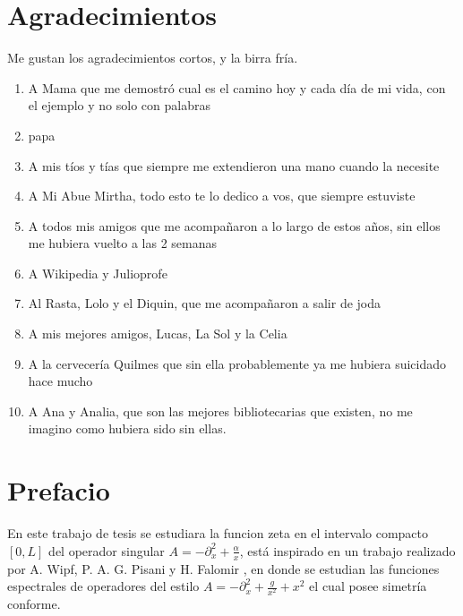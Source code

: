 \documentclass[11pt]{book}
\begin{document}
\chapter*{Agradecimientos}

Me gustan los agradecimientos cortos, y la birra fría.

\begin{enumerate}
    \item A Mama que me demostró cual es el camino hoy y cada día de mi vida, con el ejemplo y no solo con palabras
    \item papa 
    \item  A mis tíos y tías que siempre me extendieron una mano cuando la necesite
    \item A Mi Abue Mirtha, todo esto te lo dedico a vos, que siempre estuviste 
    \item A  todos mis amigos que me acompañaron a lo largo de estos años, sin ellos me hubiera vuelto a las 2 semanas 
    \item A Wikipedia y Julioprofe
    \item Al Rasta, Lolo y el Diquin, que me acompañaron a salir de joda 
    \item A mis mejores amigos, Lucas, La Sol y la Celia
    \item A la cervecería Quilmes que sin ella probablemente ya me hubiera suicidado hace mucho
    \item A Ana y Analia, que son las mejores bibliotecarias que existen, no me imagino como hubiera sido sin ellas. 
\end{enumerate}




\chapter*{Prefacio}

\pagestyle{plain}

En este trabajo de tesis se estudiara la funcion zeta en el intervalo compacto $[0,L]$ del operador singular $A = - \partial _x ^2 + \frac{\alpha}{x} $, está inspirado en un trabajo realizado por A. Wipf, P. A. G. Pisani y  H. Falomir \cite{0305-4470-35-26-306}, en donde se estudian las funciones espectrales de operadores del estilo $A = - \partial _x ^2 + \frac{g}{x ^2} + x^2 $ el cual posee simetría conforme.
\end{document}
